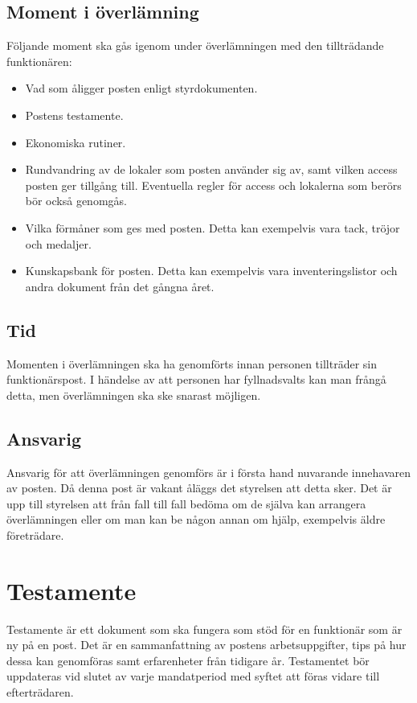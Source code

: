 \documentclass[]{dsekprotokoll}
\begin{document}
\subsection{Moment i överlämning}
Följande moment ska gås igenom under överlämningen med den
tillträdande funktionären:
\begin{itemize}
  \item Vad som åligger posten enligt styrdokumenten.
  \item Postens testamente.
  \item Ekonomiska rutiner.
  \item Rundvandring av de lokaler som posten använder sig av, samt
    vilken access posten ger tillgång till. Eventuella regler för
    access och lokalerna som berörs bör också genomgås.
  \item Vilka förmåner som ges med posten. Detta kan exempelvis vara
    tack, tröjor och medaljer.
  \item Kunskapsbank för posten. Detta kan exempelvis vara
    inventeringslistor och andra dokument från det gångna året.
\end{itemize}
\subsection{Tid}
Momenten i överlämningen ska ha genomförts innan personen tillträder
sin funktionärspost. I händelse av att personen har fyllnadsvalts kan
man frångå detta, men överlämningen ska ske snarast möjligen.

\subsection{Ansvarig}
Ansvarig för att överlämningen genomförs är i första hand nuvarande
innehavaren av posten. Då denna post är vakant åläggs det styrelsen
att detta sker. Det är upp till styrelsen att från fall till fall
bedöma om de själva kan arrangera överlämningen eller om man kan be
någon annan om hjälp, exempelvis äldre företrädare.

\section{Testamente}
Testamente är ett dokument som ska fungera som stöd för en funktionär
som är ny på en post. Det är en sammanfattning av postens
arbetsuppgifter, tips på hur dessa kan genomföras samt erfarenheter
från tidigare år. Testamentet bör uppdateras vid slutet av varje
mandatperiod med syftet att föras vidare till efterträdaren.
\end{document}
